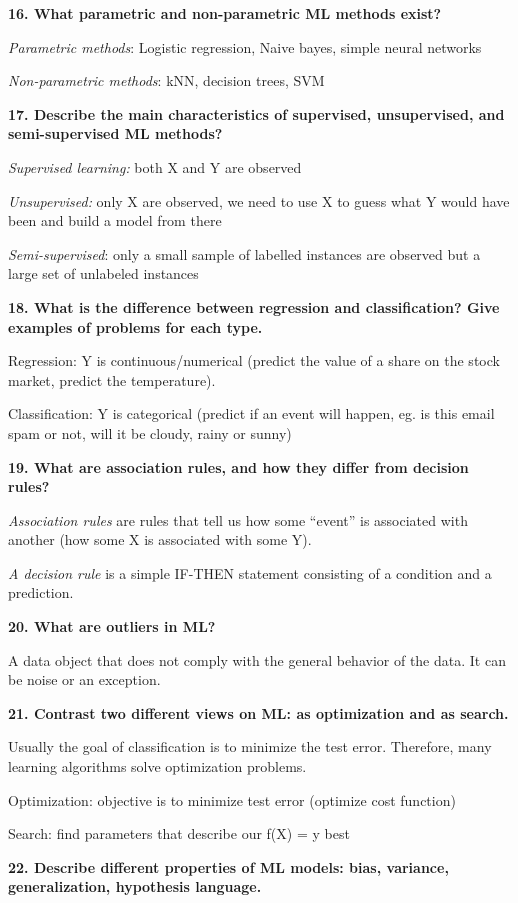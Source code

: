 \textbf{16. What parametric and non-parametric ML methods exist?}

\textit{Parametric methods}: Logistic regression, Naive bayes, simple
neural networks

\textit{Non-parametric methods}: kNN, decision trees, SVM

\textbf{17. Describe the main characteristics of supervised,
unsupervised, and semi-supervised ML methods?}

\textit{Supervised learning:} both X and Y are observed

\textit{Unsupervised:} only X are observed, we need to use X to guess
what Y would have been and build a model from there

\textit{Semi-supervised}: only a small sample of labelled instances
are observed but a large set of unlabeled instances

\textbf{18. What is the difference between regression and
classification? Give examples of problems for each type.}

Regression: Y is continuous/numerical (predict the value of a share on
the stock market, predict the temperature).

Classification: Y is categorical (predict if an event will happen, eg.
is this email spam or not, will it be cloudy, rainy or sunny)

\textbf{19. What are association rules, and how they differ from
decision rules?}

\textit{Association rules} are rules that tell us how some ``event''
is associated with another (how some X is associated with some Y).

\textit{A decision rule} is a simple IF-THEN statement consisting of
a condition and a prediction.

\textbf{20. What are outliers in ML?}

A data object that does not comply with the general behavior of the
data. It can be noise or an exception.

\textbf{21. Contrast two different views on ML: as optimization and as
search.}

Usually the goal of classification is to minimize the test error.
Therefore, many learning algorithms solve optimization problems.

Optimization: objective is to minimize test error (optimize cost
function)

Search: find parameters that describe our f(X) = y best

\textbf{22. Describe different properties of ML models: bias, variance,
generalization, hypothesis language.}

